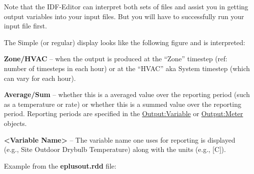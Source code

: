 Note that the IDF-Editor can interpret both sets of files and assist you in getting output variables into your input files. But you will have to successfully run your input file first.

The Simple (or regular) display looks like the following figure and is interpreted:

\textbf{Zone/HVAC} -- when the output is produced at the ``Zone'' timestep (ref: number of timesteps in each hour) or at the ``HVAC'' aka System timestep (which can vary for each hour).

\textbf{Average/Sum} -- whether this is a averaged value over the reporting period (such as a temperature or rate) or whether this is a summed value over the reporting period. Reporting periods are specified in the \hyperref[outputvariable]{Output:Variable} or \hyperref[outputmeter-and-outputmetermeterfileonly]{Output:Meter} objects.

\textbf{\textless{}Variable Name\textgreater{}} -- The variable name one uses for reporting is displayed (e.g., Site Outdoor Drybulb Temperature) along with the units (e.g., {[}C{]}).

Example from the \textbf{eplusout.rdd} file:

